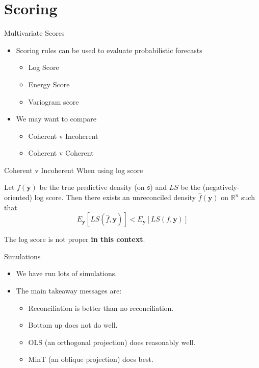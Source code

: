 \documentclass{beamer}
\begin{document}
  \section{Scoring}
  \begin{frame}{Multivariate Scores}
    \begin{itemize}
    \item Scoring rules can be used to evaluate probabilistic forecasts
        \pause
        \begin{itemize}
	      \item Log Score
	      \item Energy Score
	      \item Variogram score
        \end{itemize}
    \pause
    \item We may want to compare
    \begin{itemize}
    	\item Coherent v Incoherent
    	\item Coherent v Coherent
    \end{itemize}
    \end{itemize}
  \end{frame}
  \begin{frame}{Coherent v Incoherent}
	When using log score
	\begin{theorem}
		Let $f(\bm{y})$ be the true predictive density (on $\mathfrak{s}$) and $LS$ be the (negatively-oriented) log score.  Then there exists an unreconciled density  $\hat{f}(\bm{y})$ on $\mathbb{R}^n$ such that
		\begin{equation*}
		E_{\bm y}\left[LS(\hat{f},\bm{y})\right]<E_{\bm y}\left[LS(f,\bm{y})\right]
		\end{equation*}
	\end{theorem}
    The log score is not proper {\bf in this context}.
  \end{frame}
  \begin{frame}{Simulations}
   	\begin{itemize}
   		\item We have run lots of simulations.
   		\pause
   		\item The main takeaway messages are:
   		    \pause
   		    \begin{itemize}
   		    	\item Reconciliation is better than no reconciliation.
   		    	\pause
   		    	\item Bottom up does not do well.
   		    	\pause
   		    	\item OLS (an orthogonal projection) does reasonably well.
   		    	\pause
   		    	\item MinT (an oblique projection) does best.
   		    \end{itemize} 
   	\end{itemize}
   \end{frame}
\end{document}
